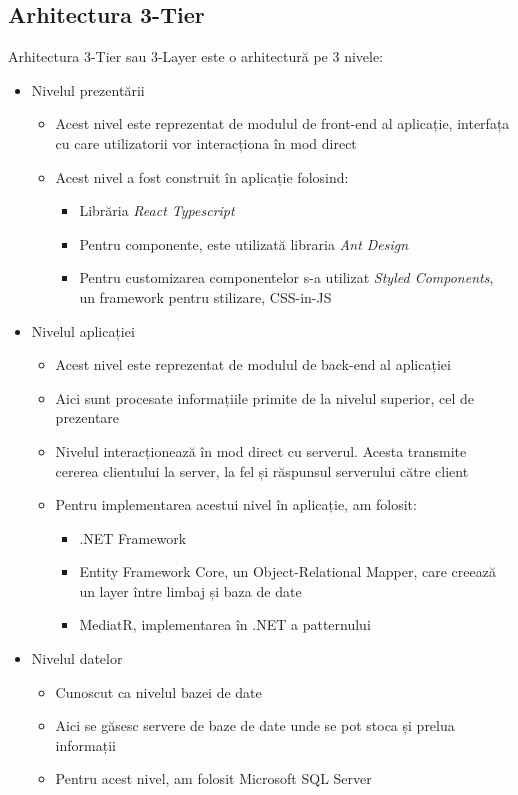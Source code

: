 \subsection{Arhitectura 3-Tier}
Arhitectura 3-Tier sau 3-Layer este o arhitectură pe 3 nivele: 
\begin{itemize}
	\setlength\itemsep{0.5em}
    \item Nivelul prezentării
    \begin{itemize}
        \setlength\itemsep{0.5em}
        \item Acest nivel este reprezentat de modulul de front-end al aplicație, interfața cu care utilizatorii vor interacționa în mod direct
        \item Acest nivel a fost construit în aplicație folosind:
        \begin{itemize}
            \setlength\itemsep{0.5em}
            \item Librăria {\it React Typescript}
            \item Pentru componente, este utilizată libraria {\it Ant Design}
            \item Pentru customizarea componentelor s-a utilizat {\it Styled Components}, un framework pentru stilizare, CSS-in-JS
        \end{itemize}
    \end{itemize}
    \item Nivelul aplicației
    \begin{itemize}
        \setlength\itemsep{0.5em}
        \item Acest nivel este reprezentat de modulul de back-end al aplicației
        \item Aici sunt procesate informațiile primite de la nivelul superior, cel de prezentare
        \item Nivelul interacționează în mod direct cu serverul. Acesta transmite cererea clientului la server, la fel și răspunsul serverului către client
        \item Pentru implementarea acestui nivel în aplicație, am folosit:
        \begin{itemize}
            \setlength\itemsep{0.5em}
            \item .NET Framework
            \item Entity Framework Core, un Object-Relational Mapper, care creează un layer între limbaj și baza de date
            \item MediatR, implementarea în .NET a patternului
        \end{itemize}
    \end{itemize}
    \item Nivelul datelor
    \begin{itemize}
        \setlength\itemsep{0.5em}
        \item Cunoscut ca nivelul bazei de date
        \item Aici se găsesc servere de baze de date unde se pot stoca și prelua informații
        \item Pentru acest nivel, am folosit Microsoft SQL Server
    \end{itemize}
\end{itemize}
